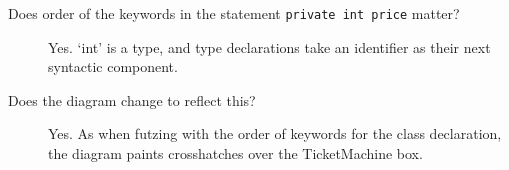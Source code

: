 \begin{description}
	\item [Does order of the keywords in the statement
		\texttt{private int price} matter?] Yes. `int' is a
		type, and type declarations take an identifier as their
		next syntactic component.
	\item [Does the diagram change to reflect this?] Yes. As when
		futzing with the order of keywords for the class
		declaration, the diagram paints crosshatches over the
		TicketMachine box.
\end{description}
